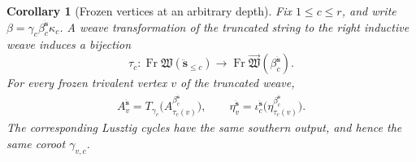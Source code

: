 \documentclass[12pt, reqno]{amsart}
\theoremstyle{plain}
\newtheorem{corollary}[theorem]{Corollary}
\theoremstyle{definition}
\numberwithin{equation}{section}
\begin{document}
\begin{corollary}[Frozen vertices at an arbitrary depth]
\label{cor:frozen-block-transport}
Fix \(1\leq c\leq r\), and write
\(\beta=\gamma_c\beta_c^{\ddot{\mathbf s}}\kappa_c\).
A weave transformation of the truncated string to the right
inductive weave induces a bijection
\[
 \tau_c\colon
 \operatorname{Fr}\mathfrak W(\ddot{\mathbf s}_{\leq c})
 \longrightarrow
 \operatorname{Fr}\overrightarrow{\mathfrak W}
     (\beta_c^{\ddot{\mathbf s}}).
\]
For every frozen trivalent vertex \(v\) of the truncated weave,
\begin{equation}\label{eq:frozen-block-transport}
\begin{aligned}
 A_v^{\ddot{\mathbf s}}
 =T_{\gamma_c}
     \bigl(A_{\tau_c(v)}^{\beta_c^{\ddot{\mathbf s}}}\bigr),\qquad
 \eta_v^{\ddot{\mathbf s}}
 =\iota_c^{\ddot{\mathbf s}}
     \bigl(\eta_{\tau_c(v)}^{\beta_c^{\ddot{\mathbf s}}}\bigr).
\end{aligned}
\end{equation}
The corresponding Lusztig cycles have the same southern output,
and hence the same coroot \(\gamma_{v,c}\).
\end{corollary}
\end{document}
